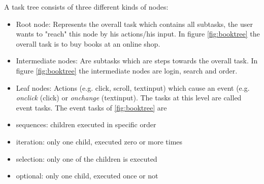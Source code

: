 A task tree consists of three different kinds of nodes:
\begin{itemize} 
	\item Root node: Represents the overall task which contains all subtasks, the user wants to "reach" this node by his actions/his input. 
		In figure \ref{fig:booktree} the overall task is to buy books at an online shop.
	\item Intermediate nodes: Are subtasks which are steps towards the overall task. In figure \ref{fig:booktree} the intermediate nodes are login, search and order.
	\item Leaf nodes: Actions (e.g. click, scroll, textinput) which cause an event (e.g. \textit{onclick} (click) or \textit{onchange} (textinput). The tasks at this level are called event tasks.
		The event tasks of \ref{fig:booktree} are 
\end{itemize}

	\begin{itemize}
		\item sequences: children executed in specific order
		\item iteration: only one child, executed zero or more times
		\item selection: only one of the children is executed
		\item optional:  only one child, executed once or not
	\end{itemize}	
	
